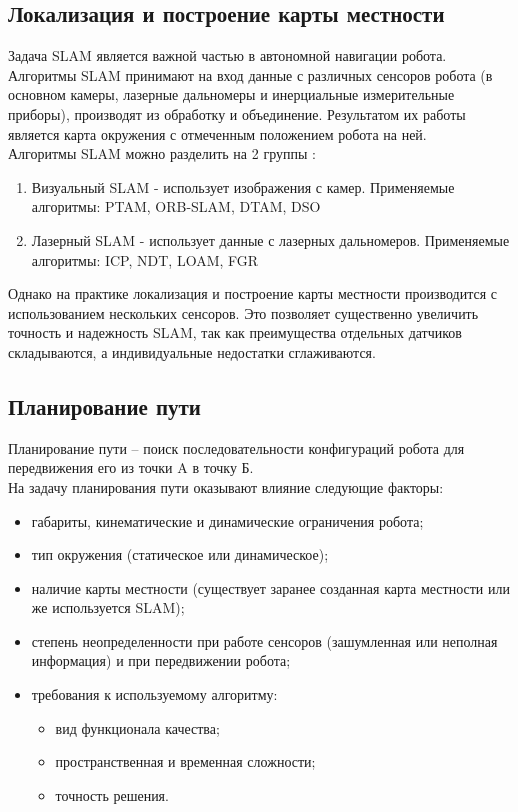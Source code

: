 \subsection{Локализация и построение карты местности}
Задача SLAM является важной частью в автономной навигации робота. Алгоритмы SLAM принимают на вход данные с различных сенсоров робота (в основном камеры, лазерные дальномеры и инерциальные измерительные приборы), производят из обработку и объединение. Результатом их работы является карта окружения с отмеченным положением робота на ней. \\
Алгоритмы SLAM можно разделить на 2 группы \cite{barfoot2024state}:
\begin{enumerate}
    \item Визуальный SLAM - использует изображения с камер. Применяемые алгоритмы: PTAM, ORB-SLAM, DTAM, DSO
    \item Лазерный SLAM - использует данные с лазерных дальномеров. Применяемые алгоритмы: ICP, NDT, LOAM, FGR
\end{enumerate}

Однако на практике локализация и построение карты местности производится с использованием нескольких сенсоров. Это позволяет существенно увеличить точность и надежность SLAM, так как преимущества отдельных датчиков складываются, а индивидуальные недостатки сглаживаются.

\subsection{Планирование пути}
Планирование пути – поиск последовательности конфигураций робота для передвижения его из точки A в точку Б.  \\
На задачу планирования пути оказывают влияние следующие факторы:
\begin{itemize}
    \item габариты, кинематические и динамические ограничения робота;
    \item тип окружения (статическое или динамическое);
    \item наличие карты местности (существует заранее созданная карта местности или же используется SLAM);
    \item степень неопределенности при работе сенсоров (зашумленная или неполная информация) и при передвижении робота;
    \item требования к используемому алгоритму:
    \begin{itemize}
        \item вид функционала качества;
        \item пространственная и временная сложности;
        \item точность решения.
    \end{itemize}
\end{itemize}

